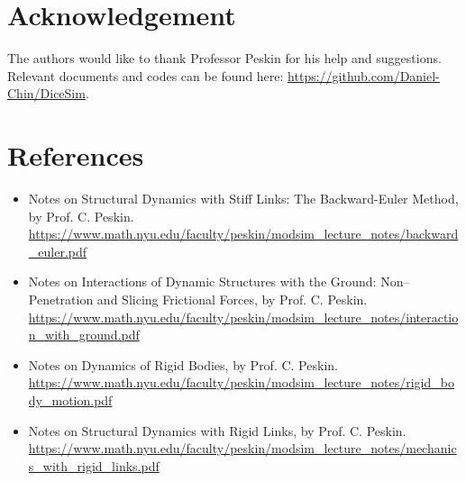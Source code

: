 \documentclass[12pt]{article}
\begin{document}
\section{Acknowledgement}
The authors would like to thank Professor Peskin for his help and suggestions. Relevant documents and codes can be found here: \url{https://github.com/Daniel-Chin/DiceSim}.
\section{References}
\begin{itemize}
  \item Notes on Structural Dynamics with Stiff Links: The Backward-Euler Method, by Prof. C. Peskin. \url{https://www.math.nyu.edu/faculty/peskin/modsim_lecture_notes/backward_euler.pdf}\\
  \item Notes on Interactions of Dynamic Structures with the Ground: Non--Penetration and Slicing Frictional Forces, by Prof. C. Peskin. \url{https://www.math.nyu.edu/faculty/peskin/modsim_lecture_notes/interaction_with_ground.pdf}\\
  \item Notes on Dynamics of Rigid Bodies, by Prof. C. Peskin. \url{https://www.math.nyu.edu/faculty/peskin/modsim_lecture_notes/rigid_body_motion.pdf}\\
  \item Notes on Structural Dynamics with Rigid Links, by Prof. C. Peskin. \url{https://www.math.nyu.edu/faculty/peskin/modsim_lecture_notes/mechanics_with_rigid_links.pdf}\\
\end{itemize}
\end{document}

